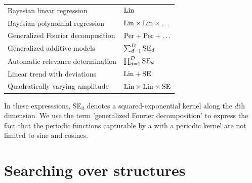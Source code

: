 \documentclass[twoside]{article}
\begin{document}
\begin{tabular}{l|l}
Bayesian linear regression & $\textrm{Lin}$ \\
Bayesian polynomial regression & $\textrm{Lin} \times \textrm{Lin} \times \ldots$\\
Generalized Fourier decomposition & $\textrm{Per} + \textrm{Per} + \ldots$ \\
Generalized additive models & $\sum_{d=1}^D \textrm{SE}_d$ \\
Automatic relevance determination & $\prod_{d=1}^D \textrm{SE}_d$ \\
Linear trend with deviations & $\textrm{Lin} + \textrm{SE}$ \\
Quadratically varying amplitude & $\textrm{Lin} \times \textrm{Lin} \times \textrm{SE}$
\end{tabular}

In these expresssions, SE$_d$ denotes a squared-exponential kernel along the $d$th dimension.
We use the term 'generalized Fourier decomposition' to express the fact that the periodic functions capturable by a \gp{} with a periodic kernel are not limited to sine and cosines.




%

\section{Searching over structures}
\end{document}
